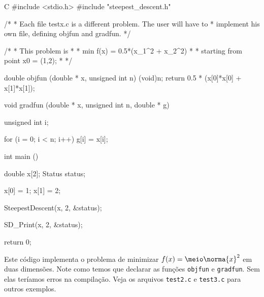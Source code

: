 \documentclass[letterpaper,11pt]{article}
\numberwithin{equation}{section}
\begin{document}
\begin{code}{C}
#include <stdio.h>
#include "steepest_descent.h"

/*
 * Each file testx.c is a different problem. The user will have to
 * implement his own file, defining objfun and gradfun.
 */

/*
 * This problem is
 *
 *  min f(x) = 0.5*(x_1^2 + x_2^2)
 *
 *  starting from point x0 = (1,2);
 *
 */

double objfun (double * x, unsigned int n) {
  (void)n;
  return 0.5 * (x[0]*x[0] + x[1]*x[1]);
}

void gradfun (double * x, unsigned int n, double * g) {
  unsigned int i;

  for (i = 0; i < n; i++)
    g[i] = x[i];
}

int main () {
  double x[2];
  Status status;

  x[0] = 1;
  x[1] = 2;

  SteepestDescent(x, 2, &status);

  SD_Print(x, 2, &status);

  return 0;
}
\end{code}
\normalsize
Este código implementa o problema de minimizar $f(x) = \meio\norma{x}^2$ em duas dimensões.
Note como temos que declarar as funções \verb+objfun+ e \verb+gradfun+. Sem elas teríamos
erros na compilação. Veja os arquivos \verb+test2.c+ e \verb+test3.c+
para outros exemplos.
\end{document}
